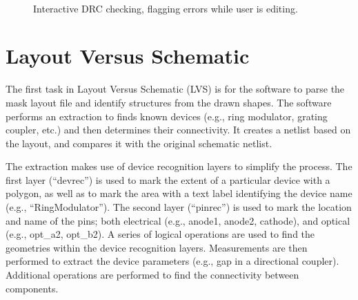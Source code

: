 \documentclass[journal]{spie}
\begin{document}
\begin{figure}[tbp]
\centering   
{}  ~ 
\caption{Interactive DRC checking, flagging errors while user is editing.}
\label{DRC1}
\end{figure}



\section{Layout Versus Schematic}

The first task in Layout Versus Schematic (LVS) is for the software to parse the mask layout file and identify structures from the drawn shapes.  The software  performs an extraction to finds known devices (e.g., ring modulator, grating coupler, etc.) and then determines their connectivity.  It  creates a netlist based on the layout, and compares it with the original schematic netlist.  

The extraction makes use of device recognition layers to simplify the process.  The first layer (``devrec'') is used to mark the extent of a particular device with a polygon, as well as to mark the area with a text label identifying the device name (e.g., ``RingModulator'').  The second layer (``pinrec'') is used to mark the location and name of the pins; both electrical (e.g., anode1, anode2, cathode), and optical (e.g., opt\_a2, opt\_b2).  A series of logical operations are used to find the geometries within the device recognition layers.  Measurements are then performed to extract the device parameters (e.g., gap in a directional coupler).  Additional operations are performed to find the connectivity between components.  
\end{document}

